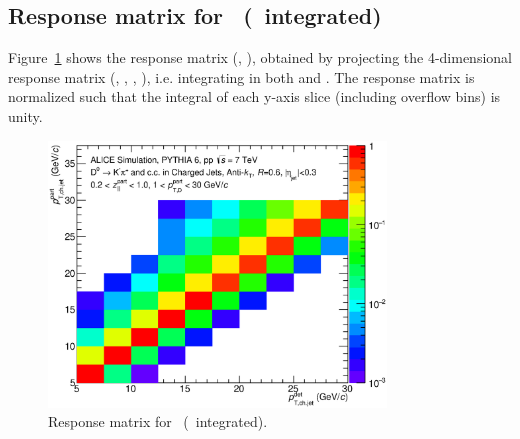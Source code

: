 \subsection{Response matrix for \ptchjet\ (\zpar\ integrated)}
Figure~\ref{fig:D0_Full_R060_ResponseMatrix_JetPt_Z_20_100_DPt_01_30_Norm} shows the response matrix (\ptchjetgen, \ptchjetdet), obtained by
projecting the 4-dimensional response matrix (\zpargen, \ptchjetgen, \zpardet, \ptchjetdet), i.e. integrating in both \zpargen and \zpardet.
The response matrix is normalized such that the integral of each y-axis slice (including overflow bins) is unity.
\begin{figure}[tbh]
\begin{center}
\includegraphics[width=0.8\textwidth]{img/D0_Full_R060_ResponseMatrix_JetPt_Z_20_100_DPt_01_30_Norm}
 \caption{Response matrix for \ptchjet\ (\zpar\ integrated).} 
 \label{fig:D0_Full_R060_ResponseMatrix_JetPt_Z_20_100_DPt_01_30_Norm}
\end{center}
\end{figure}
